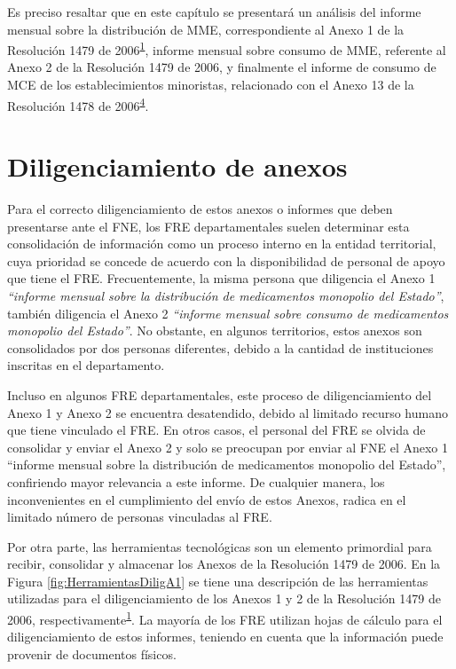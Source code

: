 \documentclass[
]{book}
\begin{document}
Es preciso resaltar que en este capítulo se presentará un análisis del informe mensual sobre la distribución de MME, correspondiente al Anexo 1 de la Resolución 1479 de 2006\textsuperscript{\protect\hyperlink{ref-MSPS1479-2006}{1}}, informe mensual sobre consumo de MME, referente al Anexo 2 de la Resolución 1479 de 2006, y finalmente el informe de consumo de MCE de los establecimientos minoristas, relacionado con el Anexo 13 de la Resolución 1478 de 2006\textsuperscript{\protect\hyperlink{ref-MSPS1478-2006}{4}}.

\hypertarget{diligenciamiento-de-anexos}{%
\section{Diligenciamiento de anexos}\label{diligenciamiento-de-anexos}}

Para el correcto diligenciamiento de estos anexos o informes que deben presentarse ante el FNE, los FRE departamentales suelen determinar esta consolidación de información como un proceso interno en la entidad territorial, cuya prioridad se concede de acuerdo con la disponibilidad de personal de apoyo que tiene el FRE. Frecuentemente, la misma persona que diligencia el Anexo 1 \emph{``informe mensual sobre la distribución de medicamentos monopolio del Estado''}, también diligencia el Anexo 2 \emph{``informe mensual sobre consumo de medicamentos monopolio del Estado''}. No obstante, en algunos territorios, estos anexos son consolidados por dos personas diferentes, debido a la cantidad de instituciones inscritas en el departamento.

Incluso en algunos FRE departamentales, este proceso de diligenciamiento del Anexo 1 y Anexo 2 se encuentra desatendido, debido al limitado recurso humano que tiene vinculado el FRE. En otros casos, el personal del FRE se olvida de consolidar y enviar el Anexo 2 y solo se preocupan por enviar al FNE el Anexo 1 ``informe mensual sobre la distribución de medicamentos monopolio del Estado'', confiriendo mayor relevancia a este informe. De cualquier manera, los inconvenientes en el cumplimiento del envío de estos Anexos, radica en el limitado número de personas vinculadas al FRE.

Por otra parte, las herramientas tecnológicas son un elemento primordial para recibir, consolidar y almacenar los Anexos de la Resolución 1479 de 2006. En la Figura \ref{fig:HerramientasDiligA1} se tiene una descripción de las herramientas utilizadas para el diligenciamiento de los Anexos 1 y 2 de la Resolución 1479 de 2006, respectivamente\textsuperscript{\protect\hyperlink{ref-MSPS1479-2006}{1}}. La mayoría de los FRE utilizan hojas de cálculo para el diligenciamiento de estos informes, teniendo en cuenta que la información puede provenir de documentos físicos.
\end{document}
